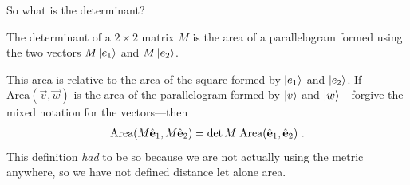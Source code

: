 So what is the determinant?
\begin{bigidea}\label{idea:det:area}
The determinant of a $2\times 2$ matrix $M$ is the area of a parallelogram formed using the two vectors $M\left|e_1\right\rangle$ and $M\left|e_2\right\rangle$. 
\end{bigidea}
This area is relative to the area of the square formed by $\left|e_1\right\rangle$ and $\left|e_2\right\rangle$. If $\text{Area}(\vec{v}, \vec{w})$ is the area of the parallelogram formed by $\left|v\right\rangle$ and $\left|w\right\rangle$---forgive the mixed notation for the vectors---then
\begin{align}
    \textnormal{Area}(M\hat{\mathbf{e}}_1, M\hat{\mathbf{e}}_2) = 
    \det M \; \textnormal{Area}(\hat{\mathbf{e}}_1, \hat{\mathbf{e}}_2) 
    \ .
\end{align}
This definition \emph{had} to be so because we are not actually using the metric anywhere, so we have not defined distance let alone area. 

